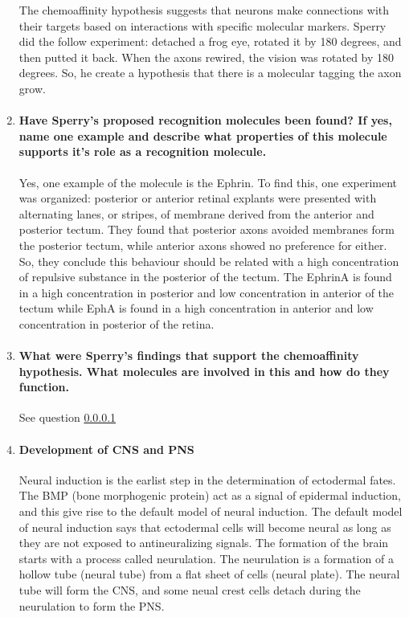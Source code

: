 \documentclass[12pt,article,oneside,a4paper]{memoir}
\begin{document}
\begin{enumerate}
The chemoaffinity hypothesis suggests that neurons make connections with their targets based on interactions with specific molecular markers. Sperry did the follow experiment: detached a frog eye, rotated it by 180 degrees, and then putted it back. When the axons rewired, the vision was rotated by 180 degrees. So, he create a hypothesis that there is a molecular tagging the axon grow.

\item \paragraph{Have Sperry’s proposed recognition molecules been found? If yes, name one example and describe what properties of this molecule supports it’s role as a recognition molecule.}\label{question:chemoaffinity}

Yes, one example of the molecule is the Ephrin. To find this, one experiment was organized: posterior or anterior retinal explants were presented with alternating lanes, or stripes, of membrane derived from the anterior and posterior tectum. They found that posterior axons avoided membranes form the posterior tectum, while anterior axons showed no preference for either. So, they conclude this behaviour should be related with a high concentration of repulsive substance in the posterior of the tectum.
The EphrinA is found in a high concentration in posterior and low concentration in anterior of the tectum while EphA is found in a high concentration in anterior and low concentration in posterior of the retina.

\item \paragraph{What were Sperry's findings that support the chemoaffinity hypothesis. What molecules are involved in this and how do they function.}
See question \ref{question:chemoaffinity}

\item \paragraph{Development of CNS and PNS}\label{question:cns-pns}
Neural induction is the earlist step in the determination of ectodermal fates. The BMP (bone morphogenic protein) act as a signal of epidermal induction, and this give rise to the default model of neural induction. The default model of neural induction says that ectodermal cells will become neural as long as they are not exposed to antineuralizing signals. The formation of the brain starts with a process called neurulation. The neurulation is a formation of a hollow tube (neural tube) from a flat sheet of cells (neural plate). The neural tube will form the CNS, and some neual crest cells detach during the neurulation to form the PNS.


\end{enumerate}
\end{document}
